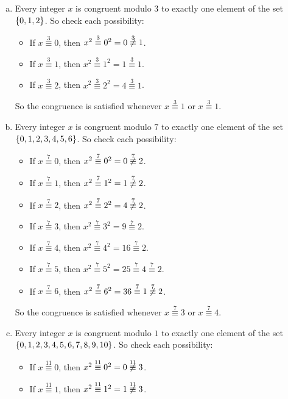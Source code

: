 \documentclass[11pt,fleqn,dvipsnames,usenames]{article}
\begin{document}
\begin{enumerate}
\solution
\begin{enumerate}[(a)]
\item Every integer $x$ is congruent modulo $3$ to exactly one element of the set $\left\{0,1,2\right\}$.  So check each possibility:
\begin{itemize}[\ ]
\item If $x\overset{3}{\equiv}0$, then $x^2\overset{3}{\equiv}0^2 = 0\not\overset{3}{\equiv}1$.
\item If $x\overset{3}{\equiv}1$, then $x^2\overset{3}{\equiv}1^2 = 1\overset{3}{\equiv}1$.
\item If $x\overset{3}{\equiv}2$, then $x^2\overset{3}{\equiv}2^2 = 4\overset{3}{\equiv}1$.
\end{itemize}
So the congruence is satisfied whenever $x\overset{3}{\equiv}1$ or $x\overset{3}{\equiv}1$.
\item Every integer $x$ is congruent modulo $7$ to exactly one element of the set $\left\{0,1,2,3,4,5,6\right\}$.  So check each possibility:
\begin{itemize}[\ ]
\item If $x\overset{7}{\equiv}0$, then $x^2\overset{7}{\equiv}0^2 = 0\not\overset{7}{\equiv}2$.
\item If $x\overset{7}{\equiv}1$, then $x^2\overset{7}{\equiv}1^2 = 1\not\overset{7}{\equiv}2$.
\item If $x\overset{7}{\equiv}2$, then $x^2\overset{7}{\equiv}2^2 = 4\not\overset{7}{\equiv}2$.
\item If $x\overset{7}{\equiv}3$, then $x^2\overset{7}{\equiv}3^2 = 9\overset{7}{\equiv}2$.
\item If $x\overset{7}{\equiv}4$, then $x^2\overset{7}{\equiv}4^2 = 16\overset{7}{\equiv}2$.
\item If $x\overset{7}{\equiv}5$, then $x^2\overset{7}{\equiv}5^2 = 25\overset{7}{\equiv}4\overset{7}{\equiv}2$.
\item If $x\overset{7}{\equiv}6$, then $x^2\overset{7}{\equiv}6^2 = 36\overset{7}{\equiv}1\not\overset{7}{\equiv}2$.
\end{itemize}
So the congruence is satisfied whenever $x\overset{7}{\equiv}3$ or $x\overset{7}{\equiv}4$.
\item Every integer $x$ is congruent modulo $1$ to exactly one element of the set $\left\{0,1,2,3,4,5,6,7,8,9,10\right\}$.  So check each possibility:
\begin{itemize}[\ ]
\item If $x\overset{11}{\equiv}0$, then $x^2\overset{11}{\equiv}0^2 = 0\not\overset{11}{\equiv}3$.
\item If $x\overset{11}{\equiv}1$, then $x^2\overset{11}{\equiv}1^2 = 1\not\overset{11}{\equiv}3$.

\end{itemize}
\end{enumerate}
\end{enumerate}
\end{document}
